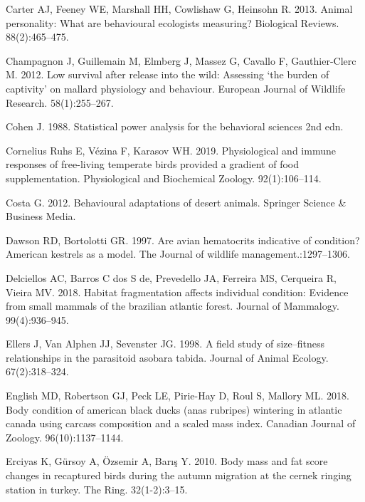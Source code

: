 \documentclass[
]{article}
\begin{document}
\leavevmode\hypertarget{ref-carter2013animal}{}%
Carter AJ, Feeney WE, Marshall HH, Cowlishaw G, Heinsohn R. 2013. Animal
personality: What are behavioural ecologists measuring? Biological
Reviews. 88(2):465--475.

\leavevmode\hypertarget{ref-champagnon2012low}{}%
Champagnon J, Guillemain M, Elmberg J, Massez G, Cavallo F,
Gauthier-Clerc M. 2012. Low survival after release into the wild:
Assessing `the burden of captivity' on mallard physiology and behaviour.
European Journal of Wildlife Research. 58(1):255--267.

\leavevmode\hypertarget{ref-cohen1988statistical}{}%
Cohen J. 1988. Statistical power analysis for the behavioral sciences
2nd edn.

\leavevmode\hypertarget{ref-cornelius2019physiological}{}%
Cornelius Ruhs E, Vézina F, Karasov WH. 2019. Physiological and immune
responses of free-living temperate birds provided a gradient of food
supplementation. Physiological and Biochemical Zoology. 92(1):106--114.

\leavevmode\hypertarget{ref-costa2012behavioural}{}%
Costa G. 2012. Behavioural adaptations of desert animals. Springer
Science \& Business Media.

\leavevmode\hypertarget{ref-dawson1997avian}{}%
Dawson RD, Bortolotti GR. 1997. Are avian hematocrits indicative of
condition? American kestrels as a model. The Journal of wildlife
management.:1297--1306.

\leavevmode\hypertarget{ref-delciellos2018habitat}{}%
Delciellos AC, Barros C dos S de, Prevedello JA, Ferreira MS, Cerqueira
R, Vieira MV. 2018. Habitat fragmentation affects individual condition:
Evidence from small mammals of the brazilian atlantic forest. Journal of
Mammalogy. 99(4):936--945.

\leavevmode\hypertarget{ref-ellers1998field}{}%
Ellers J, Van Alphen JJ, Sevenster JG. 1998. A field study of
size--fitness relationships in the parasitoid asobara tabida. Journal of
Animal Ecology. 67(2):318--324.

\leavevmode\hypertarget{ref-english2018body}{}%
English MD, Robertson GJ, Peck LE, Pirie-Hay D, Roul S, Mallory ML.
2018. Body condition of american black ducks (anas rubripes) wintering
in atlantic canada using carcass composition and a scaled mass index.
Canadian Journal of Zoology. 96(10):1137--1144.

\leavevmode\hypertarget{ref-erciyas2010body}{}%
Erciyas K, Gürsoy A, Özsemir A, Barış Y. 2010. Body mass and fat score
changes in recaptured birds during the autumn migration at the cernek
ringing station in turkey. The Ring. 32(1-2):3--15.
\end{document}
